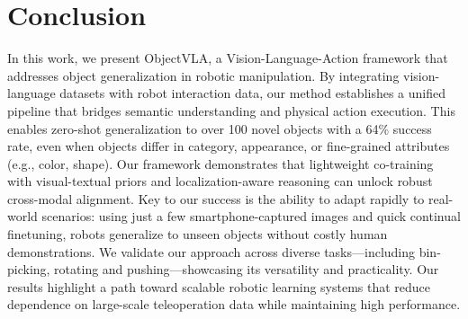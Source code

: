 \section{Conclusion}
In this work, we present ObjectVLA, a Vision-Language-Action framework that addresses object generalization in robotic manipulation. By integrating vision-language datasets with robot interaction data, our method establishes a unified pipeline that bridges semantic understanding and physical action execution. This enables zero-shot generalization to over 100 novel objects with a 64\% success rate, even when objects differ in category, appearance, or fine-grained attributes (e.g., color, shape). Our framework demonstrates that lightweight co-training with visual-textual priors and localization-aware reasoning can unlock robust cross-modal alignment. Key to our success is the ability to adapt rapidly to real-world scenarios: using just a few smartphone-captured images and quick continual finetuning, robots generalize to unseen objects without costly human demonstrations. We validate our approach across diverse tasks—including bin-picking, rotating and pushing—showcasing its versatility and practicality. Our results highlight a path toward scalable robotic learning systems that reduce dependence on large-scale teleoperation data while maintaining high performance.


